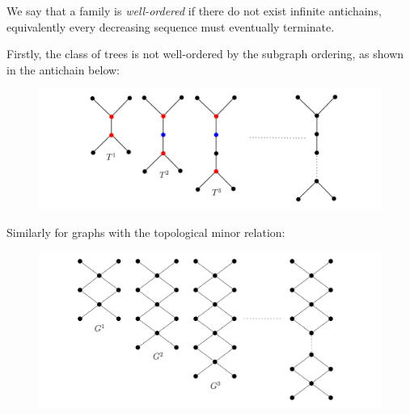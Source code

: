 We say that a family is \textit{well-ordered} if there do not exist infinite antichains, equivalently every decreasing sequence must eventually terminate.

Firstly, the class of trees is not well-ordered by the subgraph ordering, as shown in the antichain below:
\begin{figure}[h!]
    \centering
    \includegraphics[width=\textwidth]{img/minors_2_7.png}
\end{figure}

Similarly for graphs with the topological minor relation:
\begin{figure}[h!]
    \centering
    \includegraphics[width=\textwidth]{img/minors_2_7_2.png}
\end{figure}
